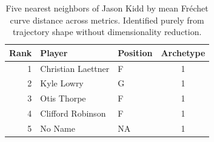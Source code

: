 \begin{table}[htbp]
  \centering\small
  \begin{tabular}{rllc}
    \toprule
    Rank & Player & Position & Archetype \\
    \midrule
    1 & Christian Laettner & F & 1 \\
    2 & Kyle Lowry & G & 1 \\
    3 & Otis Thorpe & F & 1 \\
    4 & Clifford Robinson & F & 1 \\
    5 & No Name & NA & 1 \\
    \bottomrule
  \end{tabular}
  \caption{Five nearest neighbors of Jason Kidd by mean Fr\'{e}chet curve distance across metrics. Identified purely from trajectory shape without dimensionality reduction.}
  \label{tab:Jason_Kidd_frechet_curve_neighbors}
\end{table}

